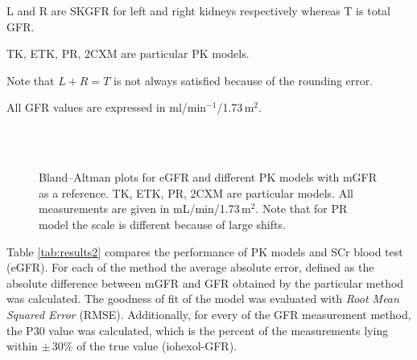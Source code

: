 \begin{landscape}
\begin{table}[H]
\begin{threeparttable}
\begin{tabular}
  \bottomrule

\end{tabular}
\begin{tablenotes}%
\footnotesize{}%
\item L and R are SKGFR for left and right kidneys respectively whereas T is total GFR.
\item TK, ETK, PR, 2CXM are particular PK models. 
\item Note that $L+R = T$ is not always satisfied because of the rounding error.
\item All GFR values are expressed in ml/min$^{-1}$/1.73\,m$^2$.
    \end{tablenotes}
	\end{threeparttable}
\end{table}
\end{landscape}


\begin{figure}[H]
	\centering
	 \\ \vspace{10pt}  
 	 \hfill {} \\ \vspace{10pt}   
	 \hfill {}

\caption[Bland–Altman plots for different methods]{Bland–Altman plots for eGFR and different PK models with mGFR as a reference. TK, ETK, PR, 2CXM are particular models. All measurements are given in mL/min/1.73\,m$^2$. Note that for PR model the scale is different because of large shifts.} 
\label{fig:baltman}
\end{figure}

Table \ref{tab:results2} compares the performance of PK models and SCr blood test (eGFR). For each of the method the average absolute error, defined as the absolute difference between mGFR and GFR obtained by the particular method was calculated.
The goodness of fit of the model was evaluated with \textit{Root Mean Squared Error} (RMSE). 
Additionally, for every of the GFR measurement method, the P30 value was calculated, which is the percent of the measurements lying within $\pm\,30\%$ of the true value (iohexol-GFR).

